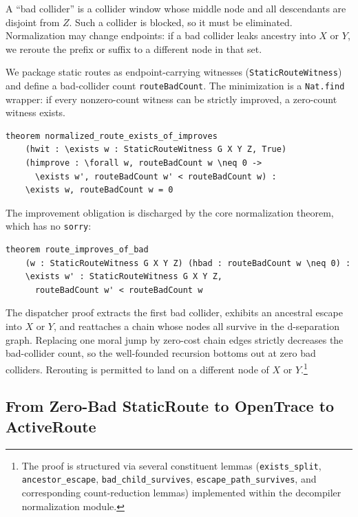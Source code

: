 \documentclass[acmsmall,screen,review,anonymous,nonacm]{acmart}
\newcommand{\lean}[1]{\lstinline!#1!}
\begin{document}
A ``bad collider'' is a collider window whose middle node and all descendants are
disjoint from $Z$.  Such a collider is blocked, so it must be eliminated.  Normalization may change endpoints: if a bad collider leaks
ancestry into $X$ or $Y$, we reroute the prefix or suffix to a different node in
that set.

We package static routes as endpoint-carrying witnesses
(\lean{StaticRouteWitness}) and define a bad-collider count \lean{routeBadCount}.
The minimization is a \lean{Nat.find} wrapper: if every nonzero-count witness can
be strictly improved, a zero-count witness exists.

\begin{lstlisting}[caption={Bad-collider minimization wrapper}]
theorem normalized_route_exists_of_improves
    (hwit : \exists w : StaticRouteWitness G X Y Z, True)
    (himprove : \forall w, routeBadCount w \neq 0 ->
      \exists w', routeBadCount w' < routeBadCount w) :
    \exists w, routeBadCount w = 0
\end{lstlisting}

The improvement obligation is discharged by the core normalization theorem,
which has no \lean{sorry}:

\begin{lstlisting}[caption={Strict improvement for non-normalized routes}]
theorem route_improves_of_bad
    (w : StaticRouteWitness G X Y Z) (hbad : routeBadCount w \neq 0) :
    \exists w' : StaticRouteWitness G X Y Z,
      routeBadCount w' < routeBadCount w
\end{lstlisting}

The dispatcher proof extracts the first bad collider, exhibits an
ancestral escape into $X$ or $Y$, and reattaches a chain whose nodes
all survive in the d-separation graph.  Replacing one moral jump by
zero-cost chain edges strictly decreases the bad-collider count, so the
well-founded recursion bottoms out at zero bad colliders.  Rerouting is
permitted to land on a different node of $X$ or $Y$.\footnote{The proof is structured via several constituent lemmas (\lean{exists_split}, \lean{ancestor_escape}, \lean{bad_child_survives}, \lean{escape_path_survives}, and corresponding count-reduction lemmas) implemented within the decompiler normalization module.}

\subsection{From Zero-Bad StaticRoute to OpenTrace to ActiveRoute}
\end{document}
